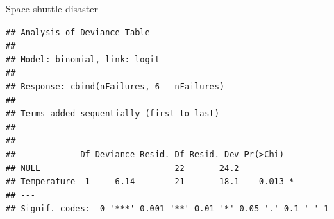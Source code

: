 \documentclass[11pt]{book}
\renewenvironment{knitrout}{\small\renewcommand{\baselinestretch}{.85}}{} %
\begin{document}
\begin{Example}{Space shuttle disaster}
\begin{knitrout}
\begin{kframe}
\begin{alltt}
 \hlstd{=}\hlstd{)}
\end{alltt}
\begin{verbatim}
## Analysis of Deviance Table
## 
## Model: binomial, link: logit
## 
## Response: cbind(nFailures, 6 - nFailures)
## 
## Terms added sequentially (first to last)
## 
## 
##             Df Deviance Resid. Df Resid. Dev Pr(>Chi)  
## NULL                           22       24.2           
## Temperature  1     6.14        21       18.1    0.013 *
## ---
## Signif. codes:  0 '***' 0.001 '**' 0.01 '*' 0.05 '.' 0.1 ' ' 1
\end{verbatim}
\end{kframe}
\end{knitrout}


\end{Example}
\end{document}
